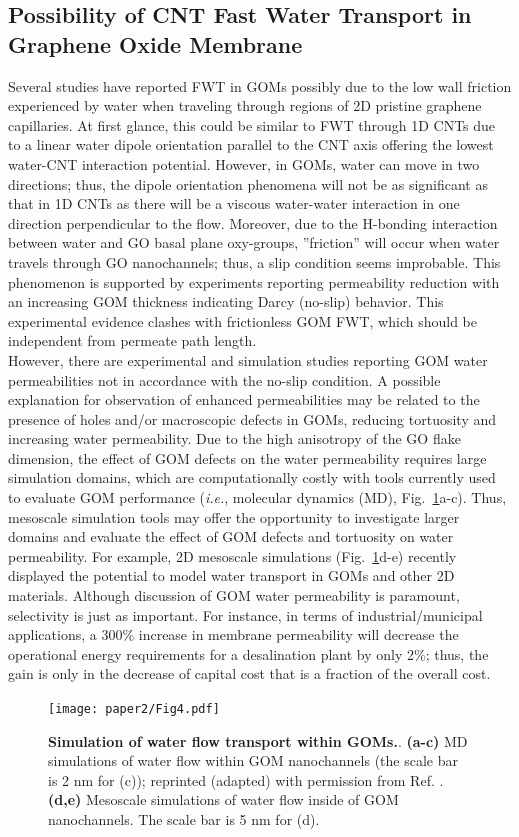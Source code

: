 \subsection{Possibility of CNT Fast Water Transport in Graphene Oxide Membrane}
Several studies have reported FWT in GOMs possibly due to the low wall friction experienced by water when traveling through regions of 2D pristine graphene capillaries. At first glance, this could be similar to FWT through 1D CNTs due to a linear water dipole orientation parallel to the CNT axis offering the lowest water-CNT interaction potential.\cite{zuo2009transport,holt2006fast} However, in GOMs, water can move in two directions; thus, the dipole orientation phenomena will not be as significant as that in 1D CNTs as there will be a viscous water-water interaction in one direction perpendicular to the flow. Moreover, due to the H-bonding interaction between water and GO basal plane oxy-groups, ''friction'' will occur when water travels through GO nanochannels; thus, a slip condition seems improbable. This phenomenon is supported by experiments reporting permeability reduction with an increasing GOM thickness indicating Darcy (no-slip) behavior.\cite{chen2016reduced} This experimental evidence clashes with frictionless GOM FWT, which should be independent from permeate path length.\\
However, there are experimental and simulation studies reporting GOM water permeabilities not in accordance with the no-slip condition.\cite{han2013ultrathin} A possible explanation for observation of enhanced permeabilities may be related to the presence of holes and/or macroscopic defects in GOMs, reducing tortuosity and increasing water permeability. Due to the high anisotropy of the GO flake dimension, the effect of GOM defects on the water permeability requires large simulation domains, which are computationally costly with tools currently used to evaluate GOM performance (\textit{i.e.}, molecular dynamics (MD), Fig.~\ref{Fig4_pap2}a-c). Thus, mesoscale simulation tools may offer the opportunity to investigate larger domains and evaluate the effect of GOM defects and tortuosity on water permeability. For example, 2D mesoscale simulations (Fig.~\ref{Fig4_pap2}d-e) recently displayed the potential to model water transport in GOMs and other 2D materials.\cite{montessori2017extended}
Although discussion of GOM water permeability is paramount, selectivity is just as important. For instance, in terms of industrial/municipal applications, a 300\% increase in membrane permeability will decrease the operational energy requirements for a desalination plant by only 2\%; thus, the gain is only in the decrease of capital cost that is a fraction of the overall cost.\cite{werber2016materials}
\begin{figure}[t!]
  \centering
  \texttt{[image: paper2/Fig4.pdf]}
  \caption{\textbf{Simulation of water flow transport within GOMs.}. \textbf{(a-c)} MD simulations of water flow within GOM nanochannels (the scale bar is 2 nm for (c)); reprinted (adapted) with permission from Ref. \cite{wei2014understanding}. \textbf{(d,e)} Mesoscale simulations of water flow inside of GOM nanochannels. The scale bar is 5 nm for (d).}
  \label{Fig4_pap2}
\end{figure}
